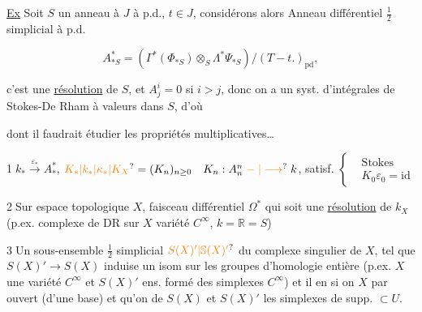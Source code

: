\uline{Ex} Soit $S$ un anneau à  $J$ à p.d., $t\in J$, considérons alors  Anneau différentiel $\frac{1}{2}$ simplicial à p.d.

\[
A^*_{*S}=(\Gamma^*(\Phi_{*S})\otimes_S\Lambda^*\Psi_{*S})/(T-t.)_{\mathrm{pd}},
\]

c'est une \uline{résolution} de $S$, et $A_j^i=0$ si $i>j$, donc on a un syst. d'intégrales de Stokes-De Rham à valeurs dans $S$, d'où


dont il faudrait étudier les propriétés multiplicatives\ldots


\textcircled{1}\quad $k_*\xrightarrow{\varepsilon_*}A_*^*$, $\unsure{K_*|k_*|\kappa_*|K_X}=(K_n)_{n\geq0}\quad K_n:A^n_n\mathrel{\unsure{\relbar|\longrightarrow}} k$, satisf. $\left\{\begin{aligned}&\text{Stokes}\\&K_0\varepsilon_0=\mathrm{id}\end{aligned}\right.$

\textcircled{2}\quad Sur  espace topologique $X$, faisceau différentiel   $\Omega^*$ qui soit une \uline{résolution} de $k_X$ (p.ex. complexe de DR sur $X$ variété $C^\infty$, $k=\mathbb{R}=S$)

\textcircled{3}\quad Un sous-ensemble $\frac{1}{2}$ simplicial $\unsure{S(X)'|\mathbb S(X)'}$ du complexe singulier de $X$, tel que $S(X)'\longrightarrow S(X)$  induise un isom sur les groupes d'homologie entière (p.ex. $X$ une variété $C^\infty$ et $S(X)'$ ens. formé des simplexes $C^\infty$) et il en  si on   $X$ par ouvert (d'une base) et qu'on  de $S(X)$ et $S(X)'$ les simplexes de supp. $\subset U$.

